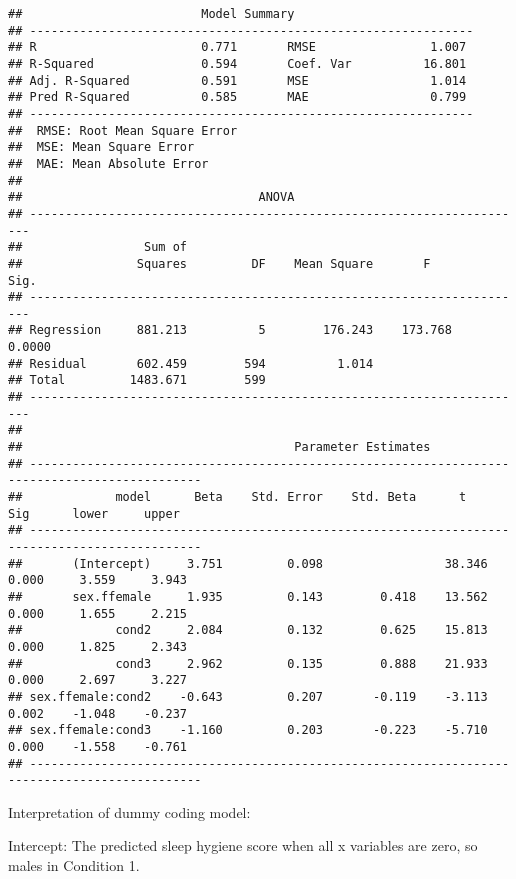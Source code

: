 \documentclass[]{article}
\begin{document}
\begin{verbatim}
##                         Model Summary                          
## --------------------------------------------------------------
## R                       0.771       RMSE                1.007 
## R-Squared               0.594       Coef. Var          16.801 
## Adj. R-Squared          0.591       MSE                 1.014 
## Pred R-Squared          0.585       MAE                 0.799 
## --------------------------------------------------------------
##  RMSE: Root Mean Square Error 
##  MSE: Mean Square Error 
##  MAE: Mean Absolute Error 
## 
##                                 ANOVA                                  
## ----------------------------------------------------------------------
##                 Sum of                                                
##                Squares         DF    Mean Square       F         Sig. 
## ----------------------------------------------------------------------
## Regression     881.213          5        176.243    173.768    0.0000 
## Residual       602.459        594          1.014                      
## Total         1483.671        599                                     
## ----------------------------------------------------------------------
## 
##                                      Parameter Estimates                                       
## ----------------------------------------------------------------------------------------------
##             model      Beta    Std. Error    Std. Beta      t        Sig      lower     upper 
## ----------------------------------------------------------------------------------------------
##       (Intercept)     3.751         0.098                 38.346    0.000     3.559     3.943 
##       sex.ffemale     1.935         0.143        0.418    13.562    0.000     1.655     2.215 
##             cond2     2.084         0.132        0.625    15.813    0.000     1.825     2.343 
##             cond3     2.962         0.135        0.888    21.933    0.000     2.697     3.227 
## sex.ffemale:cond2    -0.643         0.207       -0.119    -3.113    0.002    -1.048    -0.237 
## sex.ffemale:cond3    -1.160         0.203       -0.223    -5.710    0.000    -1.558    -0.761 
## ----------------------------------------------------------------------------------------------
\end{verbatim}

Interpretation of dummy coding model:

Intercept: The predicted sleep hygiene score when all x variables are
zero, so males in Condition 1.
\end{document}
